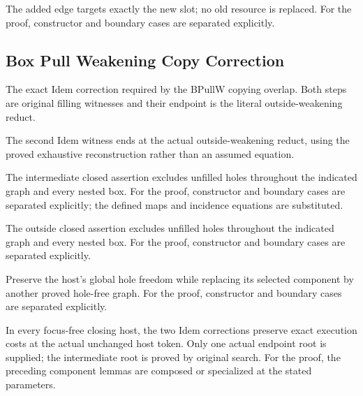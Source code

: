 The added edge targets exactly the new slot; no old resource is replaced.
For the proof, constructor and boundary cases are separated explicitly.
\par{}

\subsection{Box Pull Weakening Copy Correction}
The exact Idem correction required by the BPullW copying overlap. Both steps are original filling witnesses and their endpoint is the literal outside-weakening reduct.

The second Idem witness ends at the actual outside-weakening reduct, using the proved exhaustive reconstruction rather than an assumed equation.
\par{}

The intermediate closed assertion excludes unfilled holes throughout the indicated graph and every nested box.
For the proof, constructor and boundary cases are separated explicitly; the defined maps and incidence equations are substituted.
\par{}

The outside closed assertion excludes unfilled holes throughout the indicated graph and every nested box.
For the proof, constructor and boundary cases are separated explicitly.
\par{}

Preserve the host's global hole freedom while replacing its selected component by another proved hole-free graph.
For the proof, constructor and boundary cases are separated explicitly.
\par{}

In every focus-free closing host, the two Idem corrections preserve exact execution costs at the actual unchanged host token. Only one actual endpoint root is supplied; the intermediate root is proved by original search.
For the proof, the preceding component lemmas are composed or specialized at the stated parameters.
\par{}

